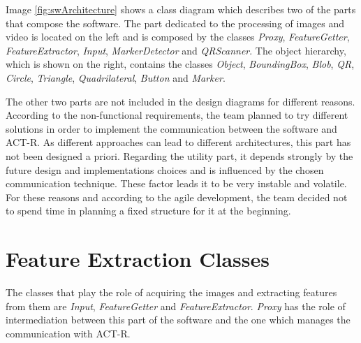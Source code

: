 	Image \ref{fig:swArchitecture} shows a class diagram which describes two of the parts that compose the software. 
	The part dedicated to the processing of images and video is located on the left and is composed by the classes \emph{Proxy}, \emph{FeatureGetter}, \emph{FeatureExtractor}, \emph{Input}, \emph{MarkerDetector} and \emph{QRScanner}.
	The object hierarchy, which is shown on the right, contains the classes \emph{Object}, \emph{BoundingBox}, \emph{Blob}, \emph{QR}, \emph{Circle}, \emph{Triangle}, \emph{Quadrilateral}, \emph{Button} and \emph{Marker}.

	

	The other two parts are not included in the design diagrams for different reasons. 
	According to the non-functional requirements, the team planned to try different solutions in order to implement the communication between the software and ACT-R. As different approaches can lead to different architectures, this part has not been designed a priori.
	Regarding the utility part, it depends strongly by the future design and implementations choices and is influenced by the chosen communication technique. These factor leads it to be very instable and volatile. 
	For these reasons and according to the agile development, the team decided not to spend time in planning a fixed structure for it at the beginning.

	
	
	\section{Feature Extraction Classes}\label{featExtraction}	
	The classes that play the role of acquiring the images and extracting features from them are \emph{Input}, \emph{FeatureGetter} and \emph{FeatureExtractor}. \emph{Proxy} has the role of intermediation between this part of the software and the one which manages the communication with \mbox{ACT-R}.

